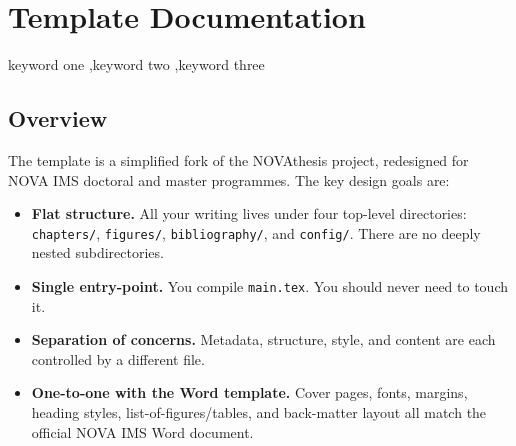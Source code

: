 \chapter{Template Documentation} \label{chap:template}


\begin{chapterfrontmatter}
\author[1]{Dhruv Akshay Pandit}




  \begin{abstract}
    \small \noindent This chapter is the complete documentation for the NOVA IMS LaTeX Thesis Template.
It explains how every configuration file works, what each option does, and how to
adapt the template for your own thesis.  Read this chapter carefully before you
start writing.  Once you are comfortable, you can delete or archive it and replace
it with your own Introduction.
  \end{abstract}
  \begin{keyword}
    \small
    keyword one \sep keyword two \sep keyword three
  \end{keyword}
\end{chapterfrontmatter}
\section{Overview} \label{sec:overview}

The template is a simplified fork of the NOVAthesis project, redesigned for
NOVA IMS doctoral and master programmes.  The key design goals are:

\begin{itemize}
  \item \textbf{Flat structure.}  All your writing lives under four top-level
        directories: \texttt{chapters/}, \texttt{figures/}, \texttt{bibliography/},
        and \texttt{config/}.  There are no deeply nested subdirectories.
  \item \textbf{Single entry-point.}  You compile \texttt{main.tex}.  You should
        never need to touch it.
  \item \textbf{Separation of concerns.}  Metadata, structure, style, and content
        are each controlled by a different file.
  \item \textbf{One-to-one with the Word template.}  Cover pages, fonts, margins,
        heading styles, list-of-figures/tables, and back-matter layout all match
        the official NOVA IMS Word document.
\end{itemize}

